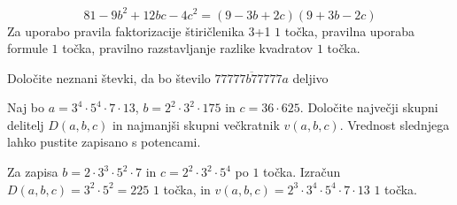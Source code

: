 \documentclass[addpoints]{exam}
\begin{document}
\begin{questions}
\begin{parts}
        \begin{solution}[1cm]
            $$81-9b^2+12bc-4c^2=(9-3b+2c)(9+3b-2c)$$
            Za uporabo pravila faktorizacije štiričlenika 3+1 $1$ točka, pravilna uporaba formule $1$ točka, pravilno razstavljanje razlike kvadratov $1$ točka.
        \end{solution}


    \end{parts}


      \newpage

    \question
    Določite neznani števki, da bo število $\overline{77777b77777a}$ deljivo

\newpage


    \question[4]
    Naj bo $a=3^4\cdot 5^4\cdot 7\cdot 13$, $b=2^2\cdot 3^2\cdot 175$ in $c=36\cdot 625$. 
    Določite največji skupni delitelj $D(a,b,c)$ in najmanjši skupni večkratnik $v(a,b,c)$. Vrednost slednjega lahko pustite zapisano s potencami.

    \begin{solution}[7cm]
        Za zapisa $b=2\cdot 3^3\cdot 5^2\cdot 7$ in $c=2^2\cdot 3^2\cdot 5^4$ po $1$ točka. 
        Izračun $D(a,b,c)=3^2\cdot 5^2=225$ $1$ točka, in $v(a,b,c)=2^3\cdot 3^4\cdot 5^4\cdot 7\cdot 13$ $1$ točka.
    \end{solution}
    

\end{questions}
\end{document}
